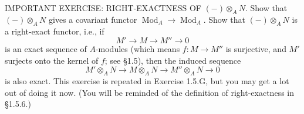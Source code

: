 IMPORTANT EXERCISE: RIGHT-EXACTNESS OF $(-)\otimes_A N$. Show that $(-)\otimes_A N$ gives a covariant functor $\operatorname{Mod}_A\to\operatorname{Mod}_A$. Show that $(-)\otimes_A N$ is a right-exact functor, i.e., if
$$
M'\to M\to M''\to 0
$$
is an exact sequence of $A$-modules (which means $f:M\to M''$ is surjective, and $M'$ surjects onto the kernel of $f$; see §1.5), then the induced sequence
$$
M'\otimes_A N\to M\otimes_A N\to M''\otimes_A N\to 0
$$
is also exact. This exercise is repeated in Exercise 1.5.G, but you may get a lot out of doing it now. (You will be reminded of the definition of right-exactness in §1.5.6.)
